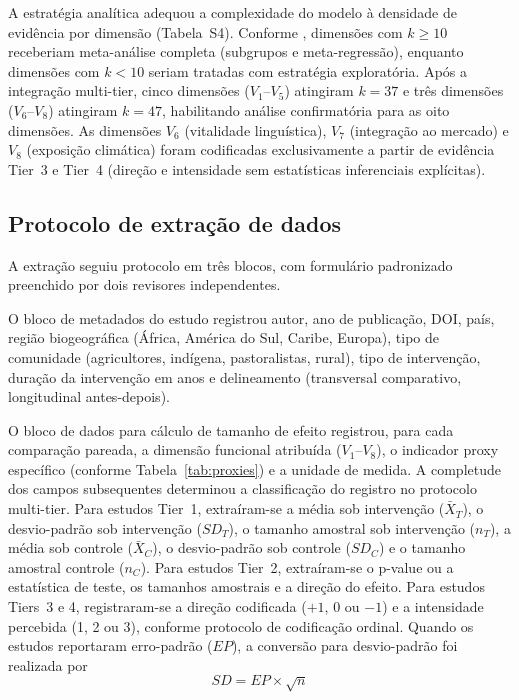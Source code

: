 \documentclass[12pt,a4paper]{article}
\begin{document}
A estratégia analítica adequou a complexidade do modelo à densidade de evidência por dimensão (Tabela~S4). Conforme \citet{Borenstein2009}, dimensões com $k \geq 10$ receberiam meta-análise completa (subgrupos e meta-regressão), enquanto dimensões com $k < 10$ seriam tratadas com estratégia exploratória. Após a integração multi-tier, cinco dimensões ($V_1$--$V_5$) atingiram $k = 37$ e três dimensões ($V_6$--$V_8$) atingiram $k = 47$, habilitando análise confirmatória para as oito dimensões. As dimensões $V_6$ (vitalidade linguística), $V_7$ (integração ao mercado) e $V_8$ (exposição climática) foram codificadas exclusivamente a partir de evidência Tier~3 e Tier~4 (direção e intensidade sem estatísticas inferenciais explícitas).

\subsection{Protocolo de extração de dados}
\label{sec:extraction}

A extração seguiu protocolo em três blocos, com formulário padronizado preenchido por dois revisores independentes.

O bloco de metadados do estudo registrou autor, ano de publicação, DOI, país, região biogeográfica (África, América do Sul, Caribe, Europa), tipo de comunidade (agricultores, indígena, pastoralistas, rural), tipo de intervenção, duração da intervenção em anos e delineamento (transversal comparativo, longitudinal antes-depois).

O bloco de dados para cálculo de tamanho de efeito registrou, para cada comparação pareada, a dimensão funcional atribuída ($V_1$--$V_8$), o indicador proxy específico (conforme Tabela~\ref{tab:proxies}) e a unidade de medida. A completude dos campos subsequentes determinou a classificação do registro no protocolo multi-tier. Para estudos Tier~1, extraíram-se a média sob intervenção ($\bar{X}_T$), o desvio-padrão sob intervenção ($SD_T$), o tamanho amostral sob intervenção ($n_T$), a média sob controle ($\bar{X}_C$), o desvio-padrão sob controle ($SD_C$) e o tamanho amostral controle ($n_C$). Para estudos Tier~2, extraíram-se o p-value ou a estatística de teste, os tamanhos amostrais e a direção do efeito. Para estudos Tiers~3 e 4, registraram-se a direção codificada ($+1$, $0$ ou $-1$) e a intensidade percebida (1, 2 ou 3), conforme protocolo de codificação ordinal. Quando os estudos reportaram erro-padrão ($EP$), a conversão para desvio-padrão foi realizada por
%
\begin{equation}
SD = EP \times \sqrt{n}
\label{eq:sd-ep}
\end{equation}
\end{document}
